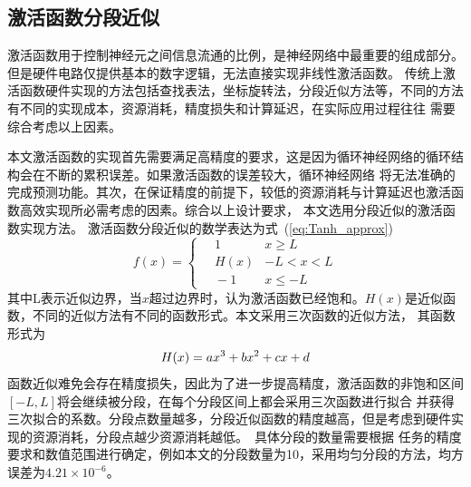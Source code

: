 \subsection{激活函数分段近似}

激活函数用于控制神经元之间信息流通的比例，是神经网络中最重要的组成部分。但是硬件电路仅提供基本的数字逻辑，无法直接实现非线性激活函数。
传统上激活函数硬件实现的方法包括查找表法，坐标旋转法，分段近似方法等，不同的方法有不同的实现成本，资源消耗，精度损失和计算延迟，在实际应用过程往往
需要综合考虑以上因素。

本文激活函数的实现首先需要满足高精度的要求，这是因为循环神经网络的循环结构会在不断的累积误差。如果激活函数的误差较大，循环神经网络
将无法准确的完成预测功能。其次，在保证精度的前提下，较低的资源消耗与计算延迟也激活函数高效实现所必需考虑的因素。综合以上设计要求，
本文选用分段近似的激活函数实现方法。
激活函数分段近似的数学表达为式~(\ref{eq:Tanh_approx})
\begin{equation}
f(x) = 
  \begin{cases} 
  \quad 1			&  x \geq L \\
  \quad H(x)     	&  -L < x < L	\\
  \quad -1			& 	x\leq -L
  \end{cases}
\label{eq:Tanh_approx}
\end{equation}
其中L表示近似边界，当\(x\)超过边界时，认为激活函数已经饱和。\(H(x)\)是近似函数，不同的近似方法有不同的函数形式。本文采用三次函数的近似方法，
其函数形式为
\begin{equation}
H(x) = ax^3 + bx^2 + cx +d	\\
\end{equation}
函数近似难免会存在精度损失，因此为了进一步提高精度，激活函数的非饱和区间\([-L,L]\)将会继续被分段，在每个分段区间上都会采用三次函数进行拟合
并获得三次拟合的系数。分段点数量越多，分段近似函数的精度越高，但是考虑到硬件实现的资源消耗，分段点越少资源消耗越低。 具体分段的数量需要根据
任务的精度要求和数值范围进行确定，例如本文的分段数量为10，采用均匀分段的方法，均方误差为\(4.21 \times 10^{-6}\)。
